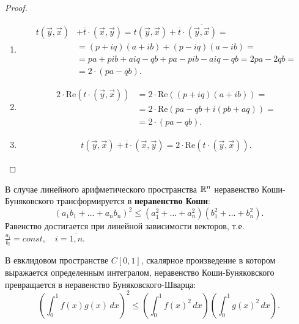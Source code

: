 \begin{proof}
    \begin{enumerate}
        \item \begin{align*}
            t(\vec{y}, \vec{x}) &+ \overline{t} \cdot (\vec{x}, \vec{y}) = t(\vec{y}, \vec{x}) + \overline{t} \cdot \overline{(\vec{y}, \vec{x})} = \\
            &= (p + iq)(a + ib) + (p - iq)(a - ib) = \\ 
            &= pa + pib + aiq - qb + pa - pib - aiq - qb = 2pa - 2qb = \\
            &= 2 \cdot (pa - qb).
        \end{align*}
        \item \begin{align*}
            2 \cdot \text{Re} (t \cdot (\vec{y}, \vec{x})) &= 2 \cdot \text{Re}((p + iq)(a + ib)) = \\
            &= 2 \cdot \text{Re}(pa - qb + i(pb + aq)) = \\
            &= 2 \cdot (pa - qb).
        \end{align*}
        \item \begin{align*}
            t(\vec{y}, \vec{x}) + \overline{t} \cdot (\vec{x}, \vec{y}) = 2 \cdot \text{Re} (t \cdot (\vec{y}, \vec{x})).
        \end{align*}
    \end{enumerate}
\end{proof}

\begin{corollary}
    В случае линейного арифметического пространства $\mathbb{R}^n$ неравенство Коши-Буняковского трансформируется в \textbf{неравенство Коши}:
    $$(a_1b_1 + \ldots + a_nb_n)^2 \leq (a_1^2 + \ldots + a_n^2)(b_1^2 + \ldots + b_n^2).$$
    Равенство достигается при линейной зависимости векторов, т.е. $\frac{a_i}{b_i} = const, \quad i = \overline{1, n}$.
\end{corollary}

\begin{corollary}
    В евклидовом пространстве $C[0, 1]$, скалярное произведение в котором выражается определенным интегралом, неравенство Коши-Буняковского превращается в неравенство Буняковского-Шварца:
    $$\left( \int_0^1 f(x)g(x) \, dx \right)^2 \le \left( \int_0^1 f(x)^2 \, dx \right) \left( \int_0^1 g(x)^2 \, dx \right).$$
\end{corollary}
